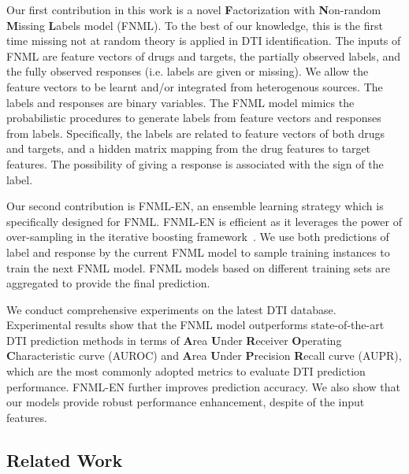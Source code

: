 \documentclass[conference]{IEEEtran}
\begin{document}
Our first contribution in this work is a novel \textbf{F}actorization with \textbf{N}on-random \textbf{M}issing \textbf{L}abels model (FNML). To the best of our knowledge, this is the first time missing not at random theory is applied in DTI identification. The inputs of FNML are feature vectors of drugs and targets, the partially observed labels, and the fully observed responses (i.e. labels are given or missing). We allow the feature vectors to be learnt and/or integrated from heterogenous sources. The labels and responses are binary variables. The FNML model mimics the probabilistic procedures to generate labels from feature vectors and responses from labels. Specifically, the labels are related to feature vectors of both drugs and targets, and a hidden matrix mapping from the drug features to target features. The possibility of giving a response is associated with the sign of the label.

Our second contribution is FNML-EN, an ensemble learning strategy which is specifically designed for FNML. FNML-EN is efficient as it leverages the power of over-sampling in the iterative boosting framework~\cite{Boosting}. We use both predictions of label and response by the current FNML model to sample training instances to train the next FNML model.  FNML models based on different training sets are aggregated to provide the final prediction.

We conduct comprehensive experiments on the latest DTI database. Experimental results show that the FNML model outperforms state-of-the-art DTI prediction methods in terms of \textbf{A}rea \textbf{U}nder \textbf{R}eceiver \textbf{O}perating \textbf{C}haracteristic curve (AUROC) and \textbf{A}rea \textbf{U}nder \textbf{P}recision \textbf{R}ecall curve (AUPR), which are the most commonly adopted metrics to evaluate DTI prediction performance. FNML-EN further improves prediction accuracy. We also show that our models provide robust performance enhancement, despite of the input features.

\subsection{Related Work}
\end{document}
